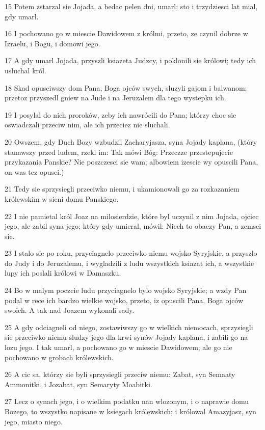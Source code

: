 \par 15 Potem zstarzal sie Jojada, a bedac pelen dni, umarl; sto i trzydziesci lat mial, gdy umarl.
\par 16 I pochowano go w miescie Dawidowem z królmi, przeto, ze czynil dobrze w Izraelu, i Bogu, i domowi jego.
\par 17 A gdy umarl Jojada, przyszli ksiazeta Judzcy, i poklonili sie królowi; tedy ich usluchal król.
\par 18 Skad opusciwszy dom Pana, Boga ojców swych, sluzyli gajom i balwanom; przetoz przyszedl gniew na Jude i na Jeruzalem dla tego wystepku ich.
\par 19 I posylal do nich proroków, zeby ich nawrócili do Pana; którzy choc sie oswiadczali przeciw nim, ale ich przeciez nie sluchali.
\par 20 Owszem, gdy Duch Bozy wzbudzil Zacharyjasza, syna Jojady kaplana, (który stanawszy przed ludem, rzekl im: Tak mówi Bóg: Przeczze przestepujecie przykazania Panskie? Nie poszczesci sie wam; albowiem izescie wy opuscili Pana, on was tez opusci.)
\par 21 Tedy sie sprzysiegli przeciwko niemu, i ukamionowali go za rozkazaniem królewskim w sieni domu Panskiego.
\par 22 I nie pamietal król Joaz na milosierdzie, które byl uczynil z nim Jojada, ojciec jego, ale zabil syna jego; który gdy umieral, mówil: Niech to obaczy Pan, a zemsci sie.
\par 23 I stalo sie po roku, przyciagnelo przeciwko niemu wojsko Syryjskie, a przyszlo do Judy i do Jeruzalemu, i wygladzili z ludu wszystkich ksiazat ich, a wszystkie lupy ich poslali królowi w Damaszku.
\par 24 Bo w malym poczcie ludu przyciagnelo bylo wojsko Syryjskie; a wzdy Pan podal w rece ich bardzo wielkie wojsko, przeto, iz opuscili Pana, Boga ojców swoich. A tak nad Joazem wykonali sady.
\par 25 A gdy odciagneli od niego, zostawiwszy go w wielkich niemocach, sprzysiegli sie przeciwko niemu sludzy jego dla krwi synów Jojady kaplana, i zabili go na lozu jego. I tak umarl, a pochowano go w miescie Dawidowem; ale go nie pochowano w grobach królewskich.
\par 26 A cic sa, którzy sie byli sprzysiegli przeciw niemu: Zabat, syn Semaaty Ammonitki, i Jozabat, syn Semaryty Moabitki.
\par 27 Lecz o synach jego, i o wielkim podatku nan wlozonym, i o naprawie domu Bozego, to wszystko napisane w ksiegach królewskich; i królowal Amazyjasz, syn jego, miasto niego.


